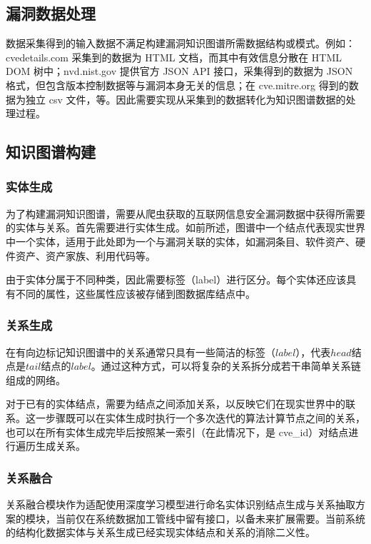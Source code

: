 \documentclass[a4paper,AutoFakeBold,oneside,12pt]{book}
\begin{document}
\subsection{漏洞数据处理}

数据采集得到的输入数据不满足构建漏洞知识图谱所需数据结构或模式。例如：cvedetails.com 采集到的数据为 HTML 文档，而其中有效信息分散在 HTML DOM 树中；nvd.nist.gov 提供官方 JSON API 接口，采集得到的数据为 JSON 格式，但包含版本控制数据等与漏洞本身无关的信息；在 cve.mitre.org 得到的数据为独立 csv 文件，等。因此需要实现从采集到的数据转化为知识图谱数据的处理过程。

\subsection{知识图谱构建}

\subsubsection{实体生成}

为了构建漏洞知识图谱，需要从爬虫获取的互联网信息安全漏洞数据中获得所需要的实体与关系。首先需要进行实体生成。如前所述，图谱中一个结点代表现实世界中一个实体，适用于此处即为一个与漏洞关联的实体，如漏洞条目、软件资产、硬件资产、资产家族、利用代码等。

由于实体分属于不同种类，因此需要标签（label）进行区分。每个实体还应该具有不同的属性，这些属性应该被存储到图数据库结点中。

\subsubsection{关系生成}

在有向边标记知识图谱中的关系通常只具有一些简洁的标签（$label$），代表$head$结点是$tail$结点的$label$。\cite{hogan_knowledge_2022}通过这种方式，可以将复杂的关系拆分成若干串简单关系链组成的网络。

对于已有的实体结点，需要为结点之间添加关系，以反映它们在现实世界中的联系。这一步骤既可以在实体生成时执行一个多次迭代的算法计算节点之间的关系，也可以在所有实体生成完毕后按照某一索引（在此情况下，是 cve{\_}id）对结点进行遍历生成关系。

\subsubsection{关系融合}

关系融合模块作为适配使用深度学习模型进行命名实体识别结点生成与关系抽取方案的模块，当前仅在系统数据加工管线中留有接口，以备未来扩展需要。当前系统的结构化数据实体与关系生成已经实现实体结点和关系的消除二义性。
\end{document}
